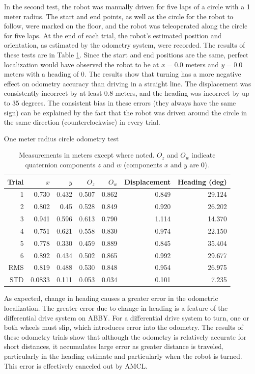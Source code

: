\documentclass[]{cwru} %
\begin{document}
In the
second test, the robot was manually driven for five laps of a circle
with a 1 meter radius. The start and end points, as well as the circle
for the robot to follow, were marked on the floor, and the robot was
teleoperated along the circle for five laps. At the end of each trial,
the robot's estimated position and orientation, as estimated by the
odometry system, were recorded. The results of these tests are in Table 
\ref{tab:loc-circles}. Since the start and end positions are the same, perfect 
localization would have observed the robot to be at $x=0.0$ meters and $y=0.0$
meters with a heading of 0. The results show that turning has a more negative
effect on odometry accuracy than driving in a straight line. The
displacement was consistently incorrect by at least 0.8 meters, and the
heading was incorrect by up to 35 degrees. The consistent bias in these
errors (they always have the same sign) can be explained by the fact
that the robot was driven around the circle in the same direction
(counterclockwise) in every trial.

\begin{table}
\caption{One meter radius circle odometry test}
\label{tab:loc-circles}
\begin{tabular}[c]{@{}rrrrrrr@{}}
\toprule
\textbf{Trial} & \textbf{$x$} & \textbf{$y$} & \textbf{$O_z$} & \textbf{$O_w$} &
\textbf{Displacement} & \textbf{Heading (deg)}\tabularnewline
\midrule
1 & 0.730 & 0.432 & 0.507 & 0.862 & 0.849 & 29.124\tabularnewline
2 & 0.802 & 0.45 & 0.528 & 0.849 & 0.920 & 26.202\tabularnewline
3 & 0.941 & 0.596 & 0.613 & 0.790 & 1.114 & 14.370\tabularnewline
4 & 0.751 & 0.621 & 0.558 & 0.830 & 0.974 & 22.150\tabularnewline
5 & 0.778 & 0.330 & 0.459 & 0.889 & 0.845 & 35.404\tabularnewline
6 & 0.892 & 0.434 & 0.502 & 0.865 & 0.992 & 29.677\tabularnewline
\midrule
RMS & 0.819 & 0.488 & 0.530 & 0.848 & 0.954 & 26.975\tabularnewline
\midrule
STD & 0.0833 & 0.111 & 0.053 & 0.034 & 0.101 & 7.235\tabularnewline
\bottomrule
\end{tabular}
\caption*{Measurements in meters except
where noted. $O_z$ and $O_w$ indicate quaternion components $z$ and $w$
(components $x$ and $y$ are 0).}
\end{table}

As expected, change in heading causes a greater error in the odometric
localization. The greater error due to change in heading is a feature of
the differential drive system on ABBY. For a differential drive system
to turn, one or both wheels must slip, which introduces error into the
odometry. The results of these odometry trials show that although the
odometry is relatively accurate for short distances, it accumulates
large error as greater distance is traveled, particularly in the heading
estimate and particularly when the robot is turned. This error is
effectively canceled out by AMCL.
\end{document}
